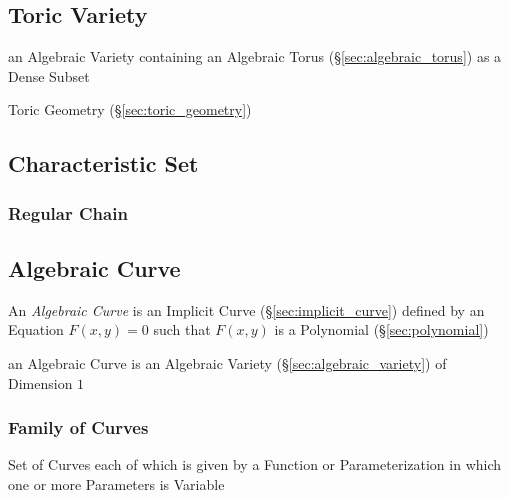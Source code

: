 \subsection{Toric Variety}\label{sec:toric_variety}

an Algebraic Variety containing an Algebraic Torus (\S\ref{sec:algebraic_torus})
as a Dense Subset

\fist Toric Geometry (\S\ref{sec:toric_geometry})



\subsection{Characteristic Set}\label{sec:characteristic_set}

\subsubsection{Regular Chain}\label{sec:regular_chain}



\subsection{Algebraic Curve}\label{sec:algebraic_curve}

An \emph{Algebraic Curve} is an Implicit Curve (\S\ref{sec:implicit_curve})
defined by an Equation $F(x,y) = 0$ such that $F(x,y)$ is a Polynomial
(\S\ref{sec:polynomial})

an Algebraic Curve is an Algebraic Variety (\S\ref{sec:algebraic_variety}) of
Dimension $1$



\subsubsection{Family of Curves}\label{sec:curve_family}

Set of Curves each of which is given by a Function or Parameterization in which
one or more Parameters is Variable

